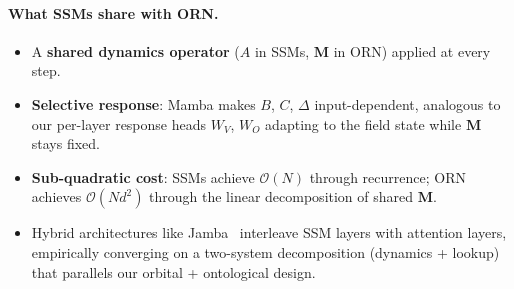 \documentclass[11pt, a4paper]{article}
\newcommand{\M}{\mathbf{M}}
\theoremstyle{remark}
\begin{document}
\paragraph{What SSMs share with ORN.}
\begin{itemize}[nosep]
    \item A \textbf{shared dynamics operator} ($A$ in SSMs, $\M$ in ORN) applied at every step.
    \item \textbf{Selective response}: Mamba makes $B$, $C$, $\Delta$ input-dependent, analogous to our per-layer response heads $W_V$, $W_O$ adapting to the field state while $\M$ stays fixed.
    \item \textbf{Sub-quadratic cost}: SSMs achieve $\mathcal{O}(N)$ through recurrence; ORN achieves $\mathcal{O}(Nd^2)$ through the linear decomposition of shared $\M$.
    \item Hybrid architectures like Jamba~\cite{lieber2024jamba} interleave SSM layers with attention layers, empirically converging on a two-system decomposition (dynamics + lookup) that parallels our orbital + ontological design.
\end{itemize}
\end{document}
